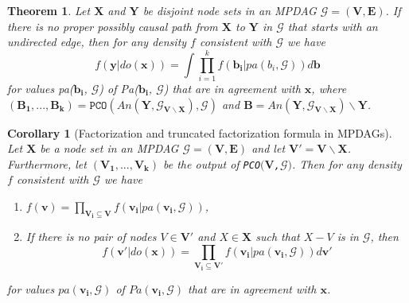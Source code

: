 \documentclass{article} %
\newtheorem{theorem}{Theorem}[section]
\newtheorem{corollary}{Corollary}[section]
\begin{document}
\begin{theorem}\citep[Theorem 3.6]{perkovic2020identifying} \label{theo: causal identification formula}
    Let $\mathbf{X}$ and $\mathbf{Y}$ be disjoint node sets in an MPDAG $\mathcal{G}=(\mathbf{V}, \mathbf{E})$. If there is no proper possibly causal path from $\mathbf{X}$ to $\mathbf{Y}$ in $\mathcal{G}$ that starts with an undirected edge, then for any density $f$ consistent with $\mathcal{G}$ we have 
    \begin{equation*}
        f(\mathbf{y}|do(\mathbf{x})) = \int \prod_{i=1}^{k} f(\mathbf{b_{i}}|pa(b_{i}, \mathcal{G})) d \mathbf{b} 
    \end{equation*}
    for values pa($\mathbf{b_i}$, $\mathcal{G}$) of Pa($\mathbf{b_i}$, $\mathcal{G}$) that are in agreement with $\mathbf{x}$, where $(\mathbf{B_1},..., \mathbf{B_k})=\texttt{PCO} (An(\mathbf{Y, \mathcal{G_{\mathbf{V} \backslash \mathbf{X}}}}), \mathcal{G})$ and $\mathbf{B}=An(\mathbf{Y}, \mathcal{G_{\mathbf{V} \backslash \mathbf{X}}}) \backslash \mathbf{Y}$.
\end{theorem}

\begin{corollary}[Factorization and truncated factorization formula in MPDAGs]\citep[Corollary 3.7]{perkovic2020identifying} \label{cor: perkovic factorization formula}
    Let $\mathbf{X}$ be a node set in an MPDAG $\mathcal{G}=(\mathbf{V}, \mathbf{E})$ and let $\mathbf{V'}=\mathbf{V} \backslash \mathbf{X}$. Furthermore, let $(\mathbf{V_1,...,V_k})$ be the output of \texttt{PCO$(\mathbf{V}$,$\mathcal{G})$}. Then for any density $f$ consistent with $\mathcal{G}$ we have
    \begin{enumerate}
        \item $f(\mathbf{v}) = \prod_{\mathbf{V_{i}} \subseteq \mathbf{V}} f(\mathbf{v_{i}}|pa(\mathbf{v_{i}}, \mathcal{G}))$, 
        \item If there is no pair of nodes $V \in \mathbf{V'}$ and $X \in \mathbf{X}$ such that $X-V$ is in $\mathcal{G}$, then
        \begin{equation*} \label{eq: identification}
        f(\mathbf{v'}|do(\mathbf{x})) 
        = \prod_{\mathbf{V_{i} \subseteq \mathbf{V'}}} f(\mathbf{v_i}|pa(\mathbf{v_i}, \mathcal{G})) d \mathbf{v'} 
    \end{equation*}
    \end{enumerate}
    for values $pa(\mathbf{v_i}, \mathcal{G})$ of $Pa(\mathbf{v_i}, \mathcal{G})$ that are in agreement with $\mathbf{x}$.
\end{corollary}
\end{document}
